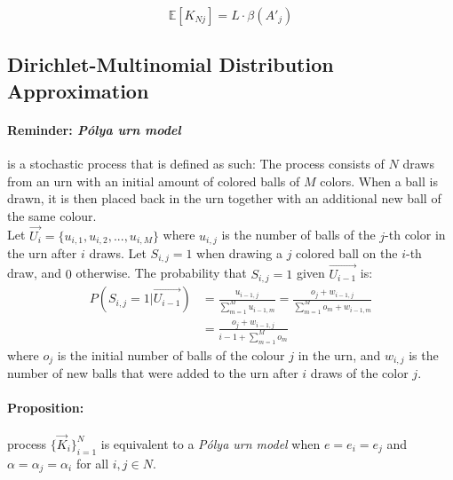 \documentclass[11pt]{article}
\begin{document}
\begin{equation}\label{linearEq}
\mathbb{E}[K_{Nj}] = L\cdot \beta(A'_j)
\end{equation}


\subsection{Dirichlet-Multinomial Distribution Approximation}
\paragraph{Reminder: \textit{Pólya urn model}}  is a stochastic process that is defined as such: 
The process consists of $N$ draws from an urn with an initial amount of colored balls of $M$ colors. When a ball is drawn, it is then placed back in the urn together with an additional new ball of the same colour.\\
Let $\vec{U_i} = \{u_{i,1},u_{i,2},...,u_{i,M}\}$  where $u_{i,j}$ is the number of balls of the $j$-th color in the urn after $i$ draws.
Let $S_{i,j}=1$ when drawing a $j$ colored ball on the $i$-th draw, and $0$ otherwise. The probability that $S_{i,j}=1$ given $\vec{U_{i-1}}$ is:
\begin{equation}\label{polya}
\begin{split}
P(S_{i,j} = 1 | \vec{U_{i-1}}) & = \frac{u_{i-1,j}}{\sum\limits_{m=1}^{M} u_{i-1,m}} = \frac{o_j + w_{i-1,j}}{\sum\limits_{m=1}^{M} o_m + w_{i-1,m}}\\
 & = \frac{o_j + w_{i-1,j}}{i-1 + \sum\limits_{m=1}^{M} o_m}
\end{split}
\end{equation}
where $o_j$ is the initial number of balls of the colour $j$ in the urn, and $w_{i,j}$ is the number of new balls that were added to the urn after $i$ draws of the color $j$.

\paragraph{Proposition:} process $\big\{\vec{K}_i\big\}_{i=1}^N$ is equivalent to a \textit{Pólya urn model} when $e=e_i=e_j$ and $\alpha=\alpha_j=\alpha_i$ for all $i,j \in N$.
\end{document}
